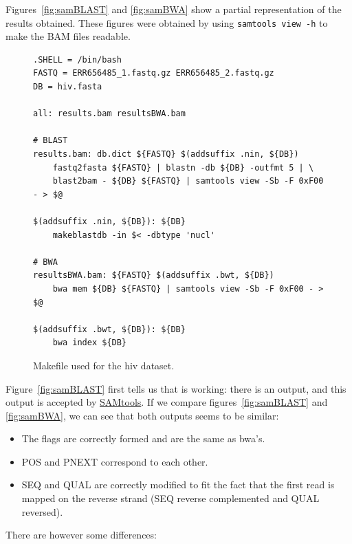Figures~\ref{fig:samBLAST} and \ref{fig:samBWA} show a partial representation of the results obtained.
These figures were obtained by using \texttt{samtools view -h} to make the BAM files readable.

\begin{figure}
\begin{lstlisting}
.SHELL = /bin/bash
FASTQ = ERR656485_1.fastq.gz ERR656485_2.fastq.gz
DB = hiv.fasta

all: results.bam resultsBWA.bam

# BLAST
results.bam: db.dict ${FASTQ} $(addsuffix .nin, ${DB})
	fastq2fasta ${FASTQ} | blastn -db ${DB} -outfmt 5 | \
	blast2bam - ${DB} ${FASTQ} | samtools view -Sb -F 0xF00 - > $@

$(addsuffix .nin, ${DB}): ${DB}
	makeblastdb -in $< -dbtype 'nucl'

# BWA
resultsBWA.bam: ${FASTQ} $(addsuffix .bwt, ${DB})
	bwa mem ${DB} ${FASTQ} | samtools view -Sb -F 0xF00 - > $@

$(addsuffix .bwt, ${DB}): ${DB}
	bwa index ${DB}
\end{lstlisting}
\caption{Makefile used for the \acrshort{hiv} dataset.}
\label{fig:hivMake}
\end{figure}

Figure~\ref{fig:samBLAST} first tells us that \blastobam{} is working: there is an output, and this output is accepted by \href{http://www.htslib.org/}{SAMtools}.
If we compare figures~\ref{fig:samBLAST} and \ref{fig:samBWA}, we can see that both outputs seems to be similar:

\begin{itemize}
    \item The flags are correctly formed and are the same as \gls{bwa}'s.
    \item POS and PNEXT correspond to each other.
    \item SEQ and QUAL are correctly modified to fit the fact that the first read is mapped on the reverse strand (SEQ reverse complemented and QUAL reversed).
\end{itemize}

There are however some differences:

